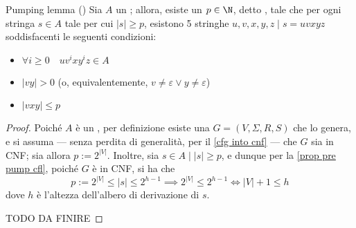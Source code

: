\documentclass[a4paper, 12pt]{report}
\begin{document}
    \begin{framedlem}[label={pump cfl}]{Pumping lemma (\CFL)}
        Sia $A$ un \CFL; allora, esiste un $p \in \N$, detto , tale che per ogni stringa $s \in A$ tale per cui $|s| \ge p$, esistono 5 stringhe $u, v, x, y, z \mid s = uvxyz$ soddisfacenti le seguenti condizioni:

        \begin{itemize}
            \item $\forall i \ge 0 \quad uv^ixy^iz \in A$
            \item $|vy| > 0$ (o, equivalentemente, $v \neq \varepsilon \lor y \neq \varepsilon$)
            \item $|vxy| \le p$
        \end{itemize}
    \end{framedlem}

    \begin{proof}
        Poiché $A$ è un \CFL, per definizione esiste una \CFG $G = (V, \Sigma, R, S)$ che lo genera, e si assuma --- senza perdita di generalità, per il \cref{cfg into cnf} --- che $G$ sia in CNF; sia allora $p := 2^{|V|}$. Inoltre, sia $s \in A \mid |s| \ge p$, e dunque per la \cref{prop pre pump cfl}, poiché $G$ è in CNF, si ha che $$p := 2^{|V|} \le |s| \le 2^{h - 1} \implies 2^{|V|} \le 2^{h - 1} \iff |V| + 1 \le h$$ dove $h$ è l'altezza dell'albero di derivazione di $s$.

        TODO DA FINIRE
    \end{proof}
\end{document}
